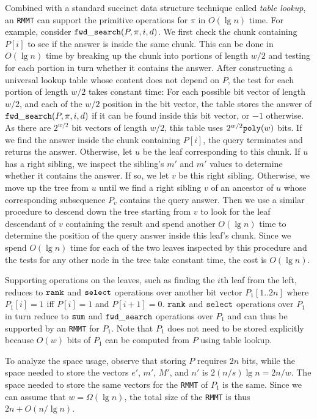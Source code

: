 Combined with a standard succinct data structure technique called {\em table
  lookup}, an {\tt RMMT} can support the primitive operations for $\pi$ in
$O(\lg n)$ time.
For example, consider $\mathtt{fwd\_search}(P,\pi,i,d)$.
We first check the chunk containing $P[i]$ to see if the answer is inside the
same chunk.
This can be done in $O(\lg n)$ time by breaking up the chunk into portions
of length $w/2$ and testing for each portion in turn whether it contains the
answer.
After constructing a universal lookup table whose content does not depend on
$P$, the test for each portion of length $w/2$ takes constant time: For each
possible bit vector of length $w/2$, and each of the $w/2$ position in the bit
vector, the table stores the answer of $\mathtt{fwd\_search}(P,\pi,i,d)$ if it can be
found inside this bit vector, or $-1$ otherwise.
As there are $2^{w/2}$ bit vectors of length $w/2$, this table uses
$2^{w/2}\mathtt{poly}(w)$ bits.
If we find the answer inside the chunk containing $P[i]$, the query terminates
and returns the answer.
Otherwise, let $u$ be the leaf corresponding to this chunk.
If $u$ has a right sibling, we inspect the sibling's $m'$ and $m'$ values to
determine whether it contains the answer.
If so, we let $v$ be this right sibling.
Otherwise, we move up the tree from $u$ until we find a right sibling $v$ of
an ancestor of $u$ whose corresponding subsequence $P_v$ contains the query
answer.
Then we use a similar procedure to descend down the tree starting from $v$ to
look for the leaf descendant of $v$ containing the result and spend another
$O(\lg n)$ time to determine the position of the query answer inside this leaf's
chunk.
Since we spend $O(\lg n)$ time for each of the two leaves inspected by this
procedure and the tests for any other node in the tree take constant time,
the cost is $O(\lg n)$.

Supporting operations on the leaves, such as finding the $i$th leaf from the
left, reduces to $\mathtt{rank}$ and $\mathtt{select}$ operations over another bit vector
$P_1[1..2n]$ where $P_1[i] = 1$ iff $P[i] = 1$ and $P[i+1] = 0$.
$\mathtt{rank}$ and $\mathtt{select}$ operations over $P_1$ in turn reduce to
$\mathtt{sum}$ and $\mathtt{fwd\_search}$ operations over $P_1$ and can thus be supported
by an {\tt RMMT} for $P_1$.
Note that $P_1$ does not need to be stored explicitly
because $O(w)$ bits of $P_1$ can be computed from $P$ %
using table lookup.

To analyze the space usage, observe that storing $P$ requires $2n$ bits, while
the space needed to store the vectors $e'$, $m'$, $M'$, and $n'$ is
$2(n/s) \lg n = 2n/w$.
The space needed to store the same vectors for the {\tt RMMT} of $P_1$ is
the same.
Since we can assume that $w = \Omega(\lg n)$, the total size of the {\tt RMMT}
is thus $2n + O(n / \lg n)$.
